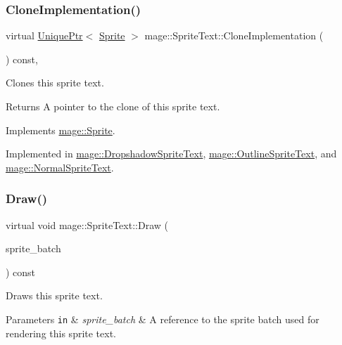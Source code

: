 \subsubsection{\texorpdfstring{Clone\+Implementation()}{CloneImplementation()}}
{\footnotesize\ttfamily virtual \hyperlink{namespacemage_a3316d7143a973e37adf1110f2e80ca31}{Unique\+Ptr}$<$ \hyperlink{classmage_1_1_sprite}{Sprite} $>$ mage\+::\+Sprite\+Text\+::\+Clone\+Implementation (\begin{DoxyParamCaption}{ }\end{DoxyParamCaption}) const\hspace{0.3cm}{\ttfamily [private]}, {}}

Clones this sprite text.

\begin{DoxyReturn}{Returns}
A pointer to the clone of this sprite text. 
\end{DoxyReturn}


Implements \hyperlink{classmage_1_1_sprite_a214890d7da493bccadb2327b8c7ffb09}{mage\+::\+Sprite}.



Implemented in \hyperlink{classmage_1_1_dropshadow_sprite_text_af997217dd243061e0490bbcd4bfde7ed}{mage\+::\+Dropshadow\+Sprite\+Text}, \hyperlink{classmage_1_1_outline_sprite_text_ac1fcc7e91b972b250e09fbb8d62f908d}{mage\+::\+Outline\+Sprite\+Text}, and \hyperlink{classmage_1_1_normal_sprite_text_acab5b61f8be4a475cd54b51278956e37}{mage\+::\+Normal\+Sprite\+Text}.

\hypertarget{classmage_1_1_sprite_text_a45d5ac8410d5a46b26e8491946a2ad9e}{}\label{classmage_1_1_sprite_text_a45d5ac8410d5a46b26e8491946a2ad9e} 
\subsubsection{\texorpdfstring{Draw()}{Draw()}}
{\footnotesize\ttfamily virtual void mage\+::\+Sprite\+Text\+::\+Draw (\begin{DoxyParamCaption}\item[{\hyperlink{classmage_1_1_sprite_batch}{Sprite\+Batch} \&}]{sprite\+\_\+batch }\end{DoxyParamCaption}) const\hspace{0.3cm}{\ttfamily [pure virtual]}}

Draws this sprite text.


\begin{DoxyParams}[1]{Parameters}
\mbox{\tt in}  & {\em sprite\+\_\+batch} & A reference to the sprite batch used for rendering this sprite text. \\
\hline
\end{DoxyParams}


